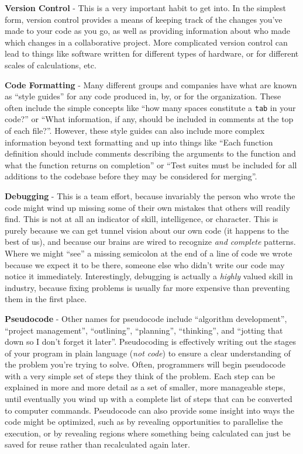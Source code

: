 \textbf{Version Control} - This is a very important habit to get into.
In the simplest form, version control provides a means of keeping track
of the changes you've made to your code as you go, as well as providing
information about who made which changes in a collaborative project.
More complicated version control can lead to things like software
written for different types of hardware, or for different scales of
calculations, etc.

\textbf{Code Formatting} - Many different groups and companies have what
are known as ``style guides'' for any code produced in, by, or for the
organization. These often include the simple concepts like ``how many
spaces constitute a \texttt{tab} in your code?'' or ``What information,
if any, should be included in comments at the top of each file?''.
However, these style guides can also include more complex information
beyond text formatting and up into things like ``Each function
definition should include comments describing the arguments to the
function and what the function returns on completion'' or ``Test suites
must be included for all additions to the codebase before they may be
considered for merging''.

\textbf{Debugging} - This is a team effort, because invariably the
person who wrote the code might wind up missing some of their own
mistakes that others will readily find. This is not at all an indicator
of skill, intelligence, or character. This is purely because we can get
tunnel vision about our own code (it happens to the best of us), and
because our brains are wired to recognize \emph{and complete} patterns.
Where we might ``see'' a missing semicolon at the end of a line of code
we wrote because we expect it to be there, someone else who didn't write
our code may notice it immediately. Interestingly, debugging is actually
a \emph{highly} valued skill in industry, because fixing problems is
usually far more expensive than preventing them in the first place.

\textbf{Pseudocode} - Other names for pseudocode include ``algorithm
development'', ``project management'', ``outlining'', ``planning'',
``thinking'', and ``jotting that down so I don't forget it later''.
Pseudocoding is effectively writing out the stages of your program in
plain language (\emph{not code}) to ensure a clear understanding of the
problem you're trying to solve. Often, programmers will begin pseudocode
with a very simple set of steps they think of the problem. Each step can
be explained in more and more detail as a set of smaller, more
manageable steps, until eventually you wind up with a complete list of
steps that can be converted to computer commands. Pseudocode can also
provide some insight into ways the code might be optimized, such as by
revealing opportunities to parallelise the execution, or by revealing
regions where something being calculated can just be saved for reuse
rather than recalculated again later.

